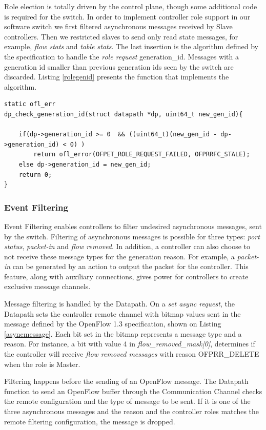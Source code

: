     Role election is totally driven by the control plane, though some additional code is required for the switch. In order to implement controller role support in our software switch we first filtered asynchronous messages received by Slave controllers. Then we restricted slaves to send only read state messages, for example, \textit{flow stats} and \textit{table stats}. The last insertion is the algorithm defined by the specification to handle the \textit{role request} generation_id. Messages with a generation id smaller than previous generation ids seen by the switch are discarded. Listing \ref{rolegenid} presents the function that implements the algorithm.
\pagebreak
\begin{lstlisting}[caption={Ethernet parsing in the nbee_link module}, label=rolegenid,]
static ofl_err
dp_check_generation_id(struct datapath *dp, uint64_t new_gen_id){

    if(dp->generation_id >= 0  && ((uint64_t)(new_gen_id - dp->generation_id) < 0) )
        return ofl_error(OFPET_ROLE_REQUEST_FAILED, OFPRRFC_STALE);
    else dp->generation_id = new_gen_id;
    return 0;
}
\end{lstlisting} 
    \subsubsection{Event Filtering}

    Event Filtering enables controllers to filter undesired asynchronous messages, sent by the switch. Filtering of asynchronous messages is possible for three types: \textit{port status}, \textit{packet-in} and \textit{flow removed}. In addition, a controller can also choose to not receive these message types for the generation reason. For example, a \textit{packet-in} can be generated by an action to output the packet for the controller. This feature, along with auxiliary connections, gives power for controllers to create exclusive message channels.
    
    Message filtering is handled by the Datapath. On a \textit{set async request}, the Datapath sets the controller remote channel with bitmap values sent in the message defined by the OpenFlow 1.3 specification, shown on Listing \ref{asyncmessage}. Each bit set in the bitmap represents a message type and a reason. For instance, a bit with value 4 in \textit{flow_removed_mask[0]}, determines if the controller will receive \textit{flow removed messages} with reason OFPRR_DELETE when the role is Master.  
    
    Filtering happens before the sending of an OpenFlow message. The Datapath function to send an OpenFlow buffer through the Communication Channel checks the remote configuration and the type of message to be sent. If it is one of the three asynchronous messages and the reason and the controller roles matches the remote filtering configuration, the message is dropped. 
    
